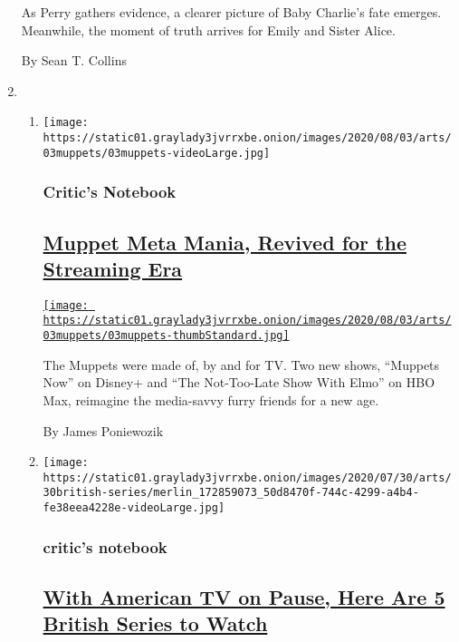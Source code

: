 \begin{enumerate}
  As Perry gathers evidence, a clearer picture of Baby Charlie's fate
  emerges. Meanwhile, the moment of truth arrives for Emily and Sister
  Alice.

  By Sean T. Collins
\item
  \begin{enumerate}
  \def\labelenumii{\arabic{enumii}.}
  \item
    \texttt{[image: https://static01.graylady3jvrrxbe.onion/images/2020/08/03/arts/03muppets/03muppets-videoLarge.jpg]}

    \hypertarget{critics-notebook}{%
    \subsubsection{Critic's Notebook}\label{critics-notebook}}

    \hypertarget{muppet-meta-mania-revived-for-the-streaming-era}{%
    \subsection{\texorpdfstring{\href{/2020/07/31/arts/television/muppets-now.html}{Muppet
    Meta Mania, Revived for the Streaming
    Era}}{Muppet Meta Mania, Revived for the Streaming Era}}\label{muppet-meta-mania-revived-for-the-streaming-era}}

    \href{/2020/07/31/arts/television/muppets-now.html}{\texttt{[image: https://static01.graylady3jvrrxbe.onion/images/2020/08/03/arts/03muppets/03muppets-thumbStandard.jpg]}}

    The Muppets were made of, by and for TV. Two new shows, ``Muppets
    Now'' on Disney+ and ``The Not-Too-Late Show With Elmo'' on HBO Max,
    reimagine the media-savvy furry friends for a new age.

    By James Poniewozik
  \item
    \texttt{[image: https://static01.graylady3jvrrxbe.onion/images/2020/07/30/arts/30british-series/merlin\_172859073\_50d8470f-744c-4299-a4b4-fe38eea4228e-videoLarge.jpg]}

    \hypertarget{critics-notebook-1}{%
    \subsubsection{critic's notebook}\label{critics-notebook-1}}

    \hypertarget{with-american-tv-on-pause-here-are-5-british-series-to-watch}{%
    \subsection{\texorpdfstring{\href{/2020/07/30/arts/television/in-my-skin-hulu.html}{With
    American TV on Pause, Here Are 5 British Series to
    Watch}}{With American TV on Pause, Here Are 5 British Series to Watch}}\label{with-american-tv-on-pause-here-are-5-british-series-to-watch}}


\end{enumerate}
\end{enumerate}
